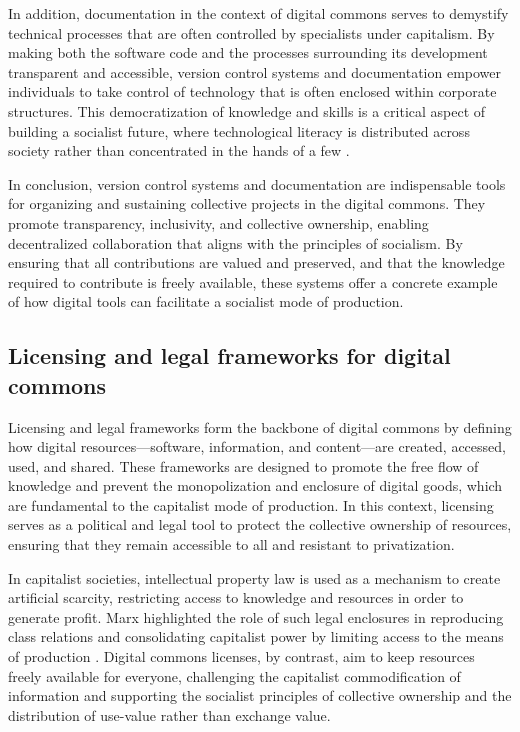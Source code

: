 \begin{refsection}
In addition, documentation in the context of digital commons serves to demystify technical processes that are often controlled by specialists under capitalism. By making both the software code and the processes surrounding its development transparent and accessible, version control systems and documentation empower individuals to take control of technology that is often enclosed within corporate structures. This democratization of knowledge and skills is a critical aspect of building a socialist future, where technological literacy is distributed across society rather than concentrated in the hands of a few \cite[pp.~45-47]{suber2012}.

In conclusion, version control systems and documentation are indispensable tools for organizing and sustaining collective projects in the digital commons. They promote transparency, inclusivity, and collective ownership, enabling decentralized collaboration that aligns with the principles of socialism. By ensuring that all contributions are valued and preserved, and that the knowledge required to contribute is freely available, these systems offer a concrete example of how digital tools can facilitate a socialist mode of production.

\subsection{Licensing and legal frameworks for digital commons}

Licensing and legal frameworks form the backbone of digital commons by defining how digital resources—software, information, and content—are created, accessed, used, and shared. These frameworks are designed to promote the free flow of knowledge and prevent the monopolization and enclosure of digital goods, which are fundamental to the capitalist mode of production. In this context, licensing serves as a political and legal tool to protect the collective ownership of resources, ensuring that they remain accessible to all and resistant to privatization.

In capitalist societies, intellectual property law is used as a mechanism to create artificial scarcity, restricting access to knowledge and resources in order to generate profit. Marx highlighted the role of such legal enclosures in reproducing class relations and consolidating capitalist power by limiting access to the means of production \cite[pp.~874-875]{marx2008}. Digital commons licenses, by contrast, aim to keep resources freely available for everyone, challenging the capitalist commodification of information and supporting the socialist principles of collective ownership and the distribution of use-value rather than exchange value.


\end{refsection}
